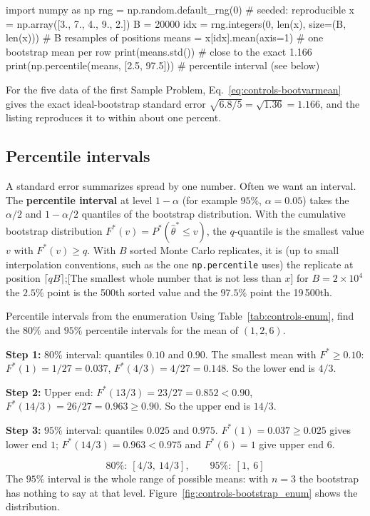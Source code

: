 \begin{pycode}
import numpy as np
rng = np.random.default_rng(0)          # seeded: reproducible
x = np.array([3., 7., 4., 9., 2.])
B = 20000
idx = rng.integers(0, len(x), size=(B, len(x)))  # B resamples of positions
means = x[idx].mean(axis=1)             # one bootstrap mean per row
print(means.std())                      # close to the exact 1.166
print(np.percentile(means, [2.5, 97.5]))  # percentile interval (see below)
\end{pycode}

For the five data of the first Sample Problem, Eq.~\eqref{eq:controls-bootvarmean} gives the exact ideal-bootstrap standard error $\sqrt{6.8/5}=\sqrt{1.36}=1.166$, and the listing reproduces it to within about one percent.

\subsection{Percentile intervals}

A standard error summarizes spread by one number. Often we want an interval. The \textbf{percentile interval} at level $1-\alpha$ (for example $95\%$, $\alpha=0.05$) takes the $\alpha/2$ and $1-\alpha/2$ quantiles of the bootstrap distribution. With the cumulative bootstrap distribution $F^*(v)=P^*(\hat\theta^*\le v)$, the $q$-quantile is the smallest value $v$ with $F^*(v)\ge q$. With $B$ sorted Monte Carlo replicates, it is (up to small interpolation conventions, such as the one \texttt{np.percentile} uses) the replicate at position $\lceil qB\rceil$;[The smallest whole number that is not less than $x$] for $B=2\times10^4$ the $2.5\%$ point is the 500th sorted value and the $97.5\%$ point the 19\,500th.

\begin{sample}{Percentile intervals from the enumeration}
Using Table~\ref{tab:controls-enum}, find the $80\%$ and $95\%$ percentile intervals for the mean of $(1,2,6)$.

\textbf{Step 1:} $80\%$ interval: quantiles $0.10$ and $0.90$. The smallest mean with $F^*\ge0.10$: $F^*(1)=1/27=0.037$, $F^*(4/3)=4/27=0.148$. So the lower end is $4/3$.

\textbf{Step 2:} Upper end: $F^*(13/3)=23/27=0.852<0.90$, $F^*(14/3)=26/27=0.963\ge0.90$. So the upper end is $14/3$.

\textbf{Step 3:} $95\%$ interval: quantiles $0.025$ and $0.975$. $F^*(1)=0.037\ge0.025$ gives lower end $1$; $F^*(14/3)=0.963<0.975$ and $F^*(6)=1$ give upper end $6$.

\[
\boxed{80\%:\ [4/3,\ 14/3],\qquad 95\%:\ [1,\ 6]}
\]
The $95\%$ interval is the whole range of possible means: with $n=3$ the bootstrap has nothing to say at that level. Figure~\ref{fig:controls-bootstrap_enum} shows the distribution.
\end{sample}

